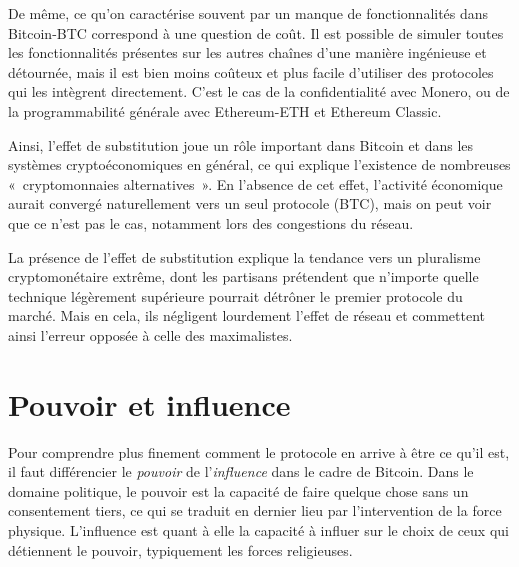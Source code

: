 De même, ce qu'on caractérise souvent par un manque de fonctionnalités dans Bitcoin-BTC correspond à une question de coût. Il est possible de simuler toutes les fonctionnalités présentes sur les autres chaînes d'une manière ingénieuse et détournée, mais il est bien moins coûteux et plus facile d'utiliser des protocoles qui les intègrent directement. C'est le cas de la confidentialité avec Monero, ou de la programmabilité générale avec Ethereum-ETH et Ethereum Classic.

Ainsi, l'effet de substitution joue un rôle important dans Bitcoin et dans les systèmes cryptoéconomiques en général, ce qui explique l'existence de nombreuses «~cryptomonnaies alternatives~». En l'absence de cet effet, l'activité économique aurait convergé naturellement vers un seul protocole (BTC), mais on peut voir que ce n'est pas le cas, notamment lors des congestions du réseau.


La présence de l'effet de substitution explique la tendance vers un pluralisme cryptomonétaire extrême, dont les partisans prétendent que n'importe quelle technique légèrement supérieure pourrait détrôner le premier protocole du marché. Mais en cela, ils négligent lourdement l'effet de réseau et commettent ainsi l'erreur opposée à celle des maximalistes.

\section*{Pouvoir et influence} %

Pour comprendre plus finement comment le protocole en arrive à être ce qu'il est, il faut différencier le \emph{pouvoir} de l'\emph{influence} dans le cadre de Bitcoin. Dans le domaine politique, le pouvoir est la capacité de faire quelque chose sans un consentement tiers, ce qui se traduit en dernier lieu par l'intervention de la force physique. L'influence est quant à elle la capacité à influer sur le choix de ceux qui détiennent le pouvoir, typiquement les forces religieuses.

